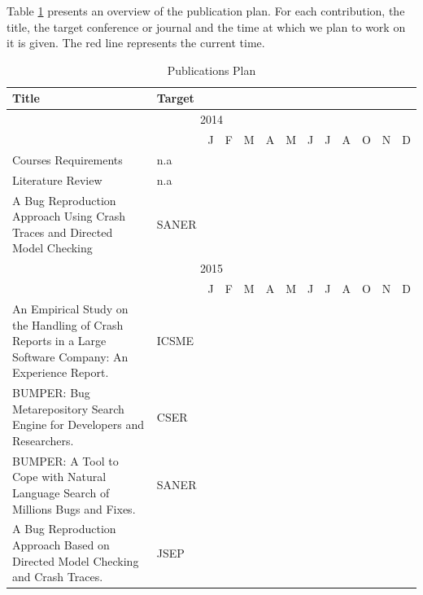 Table \ref{tab:pubPlan} presents an overview of the publication plan.
For each contribution, the title, the target conference or journal and the time at which we plan to work on it is given.
The red line represents the current time.

\begin{table}[]
\centering
\small
\caption{Publications Plan}
\label{tab:pubPlan}
\begin{tabular}{p{7cm}llllllllllll}
Title & Target & &  &  &  &  &  &  &  &  &  &  \\ \hline \hline
\multicolumn{13}{c}{2014} \\ \hline
 &  & J & F & M & A & M & J & J & A & O & N & D \\ \hline
Courses Requirements & n.a & \cellcolor{green!25} & \cellcolor{green!25} & \cellcolor{green!25} & \cellcolor{green!25} & \cellcolor{green!25} & \cellcolor{green!25} & \cellcolor{green!25} &  &  &  &  \\ \hline
Literature Review & n.a &  &  &  & \cellcolor{green!25} & \cellcolor{green!25} & \cellcolor{green!25} & \cellcolor{green!25} &  &  &  &  \\ \hline
A Bug Reproduction Approach Using Crash Traces and Directed Model Checking & SANER &  &  &  &  &  &  &  & \cellcolor{green!25} & \cellcolor{green!25} & \cellcolor{green!25} & \cellcolor{green!25} \\ \hline \hline
\multicolumn{13}{c}{2015} \\ \hline
 &  & J & F & M & A & M & J & J & A & O & N & D \\ \hline
An Empirical Study on the Handling of Crash Reports in a Large Software Company: An Experience Report. & ICSME & \cellcolor{green!25} & \cellcolor{green!25} & \cellcolor{green!25} &  &  &  &  &  &  &  &  \\ \hline
BUMPER: Bug Metarepository Search Engine for Developers and Researchers. & CSER &  &  &  & \cellcolor{green!25} & \cellcolor{green!25} & \cellcolor{green!25} & \cellcolor{green!25} & \cellcolor{green!25} & \cellcolor{green!25} & \cellcolor{green!25} & \cellcolor{green!25} \\ \hline
BUMPER: A Tool to Cope with Natural Language Search of Millions Bugs and Fixes. & SANER &  &  &  & \cellcolor{green!25} & \cellcolor{green!25} & \cellcolor{green!25} & \cellcolor{green!25} & \cellcolor{green!25} & \cellcolor{green!25} & \cellcolor{green!25} & \cellcolor{green!25} \\ \hline
A Bug Reproduction Approach Based on Directed Model Checking and Crash Traces. & JSEP &  &  &  & \cellcolor{green!25} & \cellcolor{green!25} & \cellcolor{green!25} & \cellcolor{green!25} & \cellcolor{green!25} & \cellcolor{green!25} & \cellcolor{green!25} & \cellcolor{green!25} \\ \hline \hline

\end{tabular}
\end{table}
